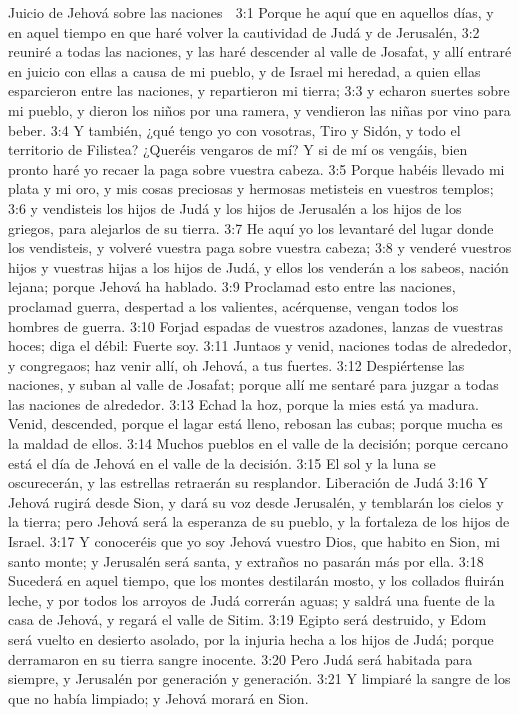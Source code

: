 Juicio de Jehová sobre las naciones  

3:1 Porque he aquí que en aquellos días, y en aquel tiempo en que haré volver la cautividad de Judá y de Jerusalén,  
3:2 reuniré a todas las naciones, y las haré descender al valle de Josafat, y allí entraré en juicio con ellas a causa de mi pueblo, y de Israel mi heredad, a quien ellas esparcieron entre las naciones, y repartieron mi tierra;  
3:3 y echaron suertes sobre mi pueblo, y dieron los niños por una ramera, y vendieron las niñas por vino para beber.  
3:4 Y también, ¿qué tengo yo con vosotras, Tiro y Sidón, y todo el territorio de Filistea? ¿Queréis vengaros de mí? Y si de mí os vengáis, bien pronto haré yo recaer la paga sobre vuestra cabeza.  
3:5 Porque habéis llevado mi plata y mi oro, y mis cosas preciosas y hermosas metisteis en vuestros templos;  
3:6 y vendisteis los hijos de Judá y los hijos de Jerusalén a los hijos de los griegos, para alejarlos de su tierra.  
3:7 He aquí yo los levantaré del lugar donde los vendisteis, y volveré vuestra paga sobre vuestra cabeza;  
3:8 y venderé vuestros hijos y vuestras hijas a los hijos de Judá, y ellos los venderán a los sabeos, nación lejana; porque Jehová ha hablado.  
3:9 Proclamad esto entre las naciones, proclamad guerra, despertad a los valientes, acérquense, vengan todos los hombres de guerra.  
3:10 Forjad espadas de vuestros azadones, lanzas de vuestras hoces; diga el débil: Fuerte soy.  
3:11 Juntaos y venid, naciones todas de alrededor, y congregaos; haz venir allí, oh Jehová, a tus fuertes.  
3:12 Despiértense las naciones, y suban al valle de Josafat; porque allí me sentaré para juzgar a todas las naciones de alrededor.  
3:13 Echad la hoz, porque la mies está ya madura. Venid, descended, porque el lagar está lleno, rebosan las cubas; porque mucha es la maldad de ellos.  
3:14 Muchos pueblos en el valle de la decisión; porque cercano está el día de Jehová en el valle de la decisión.  
3:15 El sol y la luna se oscurecerán, y las estrellas retraerán su resplandor.  
Liberación de Judá  
3:16 Y Jehová rugirá desde Sion, y dará su voz desde Jerusalén, y temblarán los cielos y la tierra; pero Jehová será la esperanza de su pueblo, y la fortaleza de los hijos de Israel.  
3:17 Y conoceréis que yo soy Jehová vuestro Dios, que habito en Sion, mi santo monte; y Jerusalén será santa, y extraños no pasarán más por ella.  
3:18 Sucederá en aquel tiempo, que los montes destilarán mosto, y los collados fluirán leche, y por todos los arroyos de Judá correrán aguas; y saldrá una fuente de la casa de Jehová, y regará el valle de Sitim.  
3:19 Egipto será destruido, y Edom será vuelto en desierto asolado, por la injuria hecha a los hijos de Judá; porque derramaron en su tierra sangre inocente.  
3:20 Pero Judá será habitada para siempre, y Jerusalén por generación y generación.  
3:21 Y limpiaré la sangre de los que no había limpiado; y Jehová morará en Sion.

